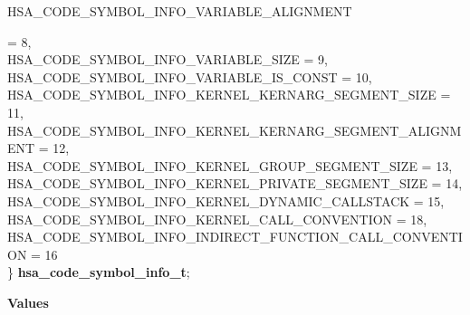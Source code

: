 \documentclass[final,oneside]{book}
\newcommand{\reftyp}[1]{#1}
\newcommand{\refenu}[1]{\reftyp{#1}}
\newenvironment{mylongtable}{\rowcolors{0}{lightgray}{lightgray}\longtable} {
\endlongtable}
\begin{document}
\begin{mylongtable}{@{}p{\textwidth}}
\hspace{1.7em}\hypertarget{group__code-object_1ggaded99609f1225ba3ed62328c7e1a3694aa98d70cb9e0aefd8e0dd4e8bb38040ee}{\refenu{HSA_\-CODE_\-SYMBOL_\-INFO_\-VARIABLE_\-ALIGNMENT}} = 8,\\
\hspace{1.7em}\hypertarget{group__code-object_1ggaded99609f1225ba3ed62328c7e1a3694a05900bfb488539bf04af7be230529f3e}{\refenu{HSA_\-CODE_\-SYMBOL_\-INFO_\-VARIABLE_\-SIZE}} = 9,\\
\hspace{1.7em}\hypertarget{group__code-object_1ggaded99609f1225ba3ed62328c7e1a3694a5f8244951160c1f391d25c61bf8f0875}{\refenu{HSA_\-CODE_\-SYMBOL_\-INFO_\-VARIABLE_\-IS_\-CONST}} = 10,\\
\hspace{1.7em}\hypertarget{group__code-object_1ggaded99609f1225ba3ed62328c7e1a3694a726e2e9506111550539829e5ae97013c}{\refenu{HSA_\-CODE_\-SYMBOL_\-INFO_\-KERNEL_\-KERNARG_\-SEGMENT_\-SIZE}} = 11,\\
\hspace{1.7em}\hypertarget{group__code-object_1ggaded99609f1225ba3ed62328c7e1a3694a6c6ec6aea6065a45e69569aa73153d73}{\refenu{HSA_\-CODE_\-SYMBOL_\-INFO_\-KERNEL_\-KERNARG_\-SEGMENT_\-ALIGNMENT}} = 12,\\
\hspace{1.7em}\hypertarget{group__code-object_1ggaded99609f1225ba3ed62328c7e1a3694a4902e8e583d06385e42500f86c68c5ee}{\refenu{HSA_\-CODE_\-SYMBOL_\-INFO_\-KERNEL_\-GROUP_\-SEGMENT_\-SIZE}} = 13,\\
\hspace{1.7em}\hypertarget{group__code-object_1ggaded99609f1225ba3ed62328c7e1a3694abab702b3188b4195d176dceabcff1893}{\refenu{HSA_\-CODE_\-SYMBOL_\-INFO_\-KERNEL_\-PRIVATE_\-SEGMENT_\-SIZE}} = 14,\\
\hspace{1.7em}\hypertarget{group__code-object_1ggaded99609f1225ba3ed62328c7e1a3694ae4737bbd966ae562f17c2ef71af46fac}{\refenu{HSA_\-CODE_\-SYMBOL_\-INFO_\-KERNEL_\-DYNAMIC_\-CALLSTACK}} = 15,\\
\hspace{1.7em}\hypertarget{group__code-object_1ggaded99609f1225ba3ed62328c7e1a3694acbd96a8a68621ed99a02ada3f71cd8d2}{\refenu{HSA_\-CODE_\-SYMBOL_\-INFO_\-KERNEL_\-CALL_\-CONVENTION}} = 18,\\
\hspace{1.7em}\hypertarget{group__code-object_1ggaded99609f1225ba3ed62328c7e1a3694a77947182f183577d8af1bbc1d168042e}{\refenu{HSA_\-CODE_\-SYMBOL_\-INFO_\-INDIRECT_\-FUNCTION_\-CALL_\-CONVENTION}} = 16\\
\} \hypertarget{group__code-object_1gaded99609f1225ba3ed62328c7e1a3694}{\textbf{hsa_\-code_\-symbol_\-info_\-t}};\rule[-2ex]{0pt}{0pt}\end{mylongtable}\noindent\textbf{Values}\\[-7mm]
\end{document}
